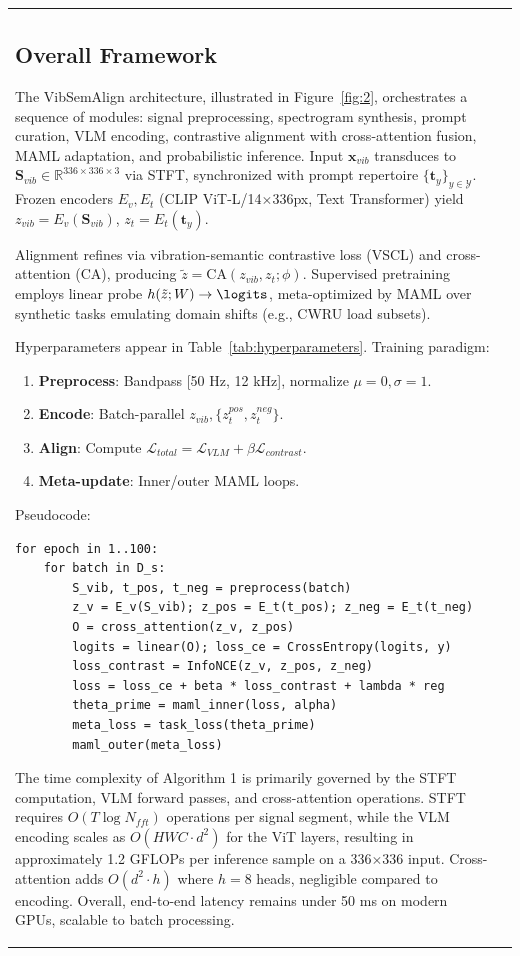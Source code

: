 \begin{table}[htbp]
\begin{tabular}{@{}ll@{}}
\subsection{Overall Framework}
\label{subsec:overall_framework}

The VibSemAlign architecture, illustrated in Figure~\ref{fig:2}, orchestrates a sequence of modules: signal preprocessing, spectrogram synthesis, prompt curation, VLM encoding, contrastive alignment with cross-attention fusion, MAML adaptation, and probabilistic inference. Input $\mathbf{x}_{vib}$ transduces to $\mathbf{S}_{vib} \in \mathbb{R}^{336 \times 336 \times 3}$ via STFT, synchronized with prompt repertoire $\{\mathbf{t}_y\}_{y\in\mathcal{Y}}$. Frozen encoders $E_v, E_t$ (CLIP ViT-L/14$\times$336px, Text Transformer) yield $z_{vib} = E_v(\mathbf{S}_{vib})$, $z_t = E_t(\mathbf{t}_y)$.

Alignment refines via vibration-semantic contrastive loss (VSCL) and cross-attention (CA), producing $\tilde{z} = \mathrm{CA}(z_{vib}, z_t; \phi)$. Supervised pretraining employs linear probe $h(\tilde{z}; W) \to \logits$, meta-optimized by MAML over synthetic tasks emulating domain shifts (e.g., CWRU load subsets).

Hyperparameters appear in Table~\ref{tab:hyperparameters}. Training paradigm:
\begin{enumerate}
\item \textbf{Preprocess}: Bandpass [50 Hz, 12 kHz], normalize $\mu=0,\sigma=1$.
\item \textbf{Encode}: Batch-parallel $z_{vib}, \{z_t^{pos}, z_t^{neg}\}$.
\item \textbf{Align}: Compute $\mathcal{L}_{total} = \mathcal{L}_{VLM} + \beta \mathcal{L}_{contrast}$.
\item \textbf{Meta-update}: Inner/outer MAML loops.
\end{enumerate}
Pseudocode:
\begin{verbatim}
for epoch in 1..100:
    for batch in D_s:
        S_vib, t_pos, t_neg = preprocess(batch)
        z_v = E_v(S_vib); z_pos = E_t(t_pos); z_neg = E_t(t_neg)
        O = cross_attention(z_v, z_pos)
        logits = linear(O); loss_ce = CrossEntropy(logits, y)
        loss_contrast = InfoNCE(z_v, z_pos, z_neg)
        loss = loss_ce + beta * loss_contrast + lambda * reg
        theta_prime = maml_inner(loss, alpha)
        meta_loss = task_loss(theta_prime)
        maml_outer(meta_loss)
\end{verbatim}

The time complexity of Algorithm 1 is primarily governed by the STFT computation, VLM forward passes, and cross-attention operations. STFT requires $O(T \log N_{fft})$ operations per signal segment, while the VLM encoding scales as $O(HWC \cdot d^2)$ for the ViT layers, resulting in approximately 1.2 GFLOPs per inference sample on a 336$\times$336 input. Cross-attention adds $O(d^2 \cdot h)$ where $h=8$ heads, negligible compared to encoding. Overall, end-to-end latency remains under 50 ms on modern GPUs, scalable to batch processing.


\end{tabular}
\end{table}
